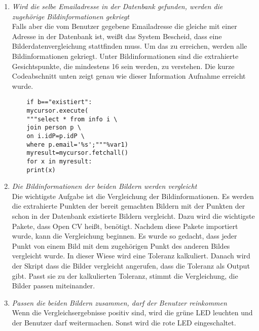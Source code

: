 \begin{enumerate}
	\item \textit{Wird die selbe Emailadresse in der Datenbank gefunden, werden die zugeh{\"o}rige Bildinformationen gekriegt} \\
	Falls aber die vom Benutzer gegebene Emailadresse die gleiche mit einer Adresse in der Datenbank ist, weißt das System Bescheid, dass eine Bilderdatenvergleichung stattfinden muss. Um das zu erreichen, werden alle Bildinformationen gekriegt. Unter Bildinformationen sind die extrahierte Gesichtspunkte, die mindestens 16 sein werden, zu verstehen. Die kurze Codeabschnitt unten zeigt genau wie dieser Information Aufnahme erreicht wurde.
	\begin{lstlisting}
	if b=="existiert":
	mycursor.execute(
	"""select * from info i \
	join person p \
	on i.idP=p.idP \
	where p.email='%s';"""%var1)
	myresult=mycursor.fetchall()
	for x in myresult:
	print(x)
	\end{lstlisting}
	\item \textit{Die Bildinformationen der beiden Bildern werden vergleicht} \\
	Die wichtigste Aufgabe ist die Vergleichung der Bildinformationen. Es werden die extrahierte Punkten der bereit gemachten Bildern mit der Punkten der schon in der Datenbank existierte Bildern vergleicht. Dazu wird die wichtigste Pakete, dass Open CV heißt, ben{\"o}tigt. Nachdem diese Pakete importiert wurde, kann die Vergleichung beginnen. Es wurde so gedacht, dass jeder Punkt von einem Bild mit dem zugeh{\"o}rigen Punkt des anderen Bildes vergleicht wurde. In dieser Wiese wird eine Toleranz kalkuliert. Danach wird der Skript dass die Bilder vergleicht angerufen, dass die Toleranz als Output gibt. Passt sie zu der kalkulierten Toleranz, stimmt die Vergleichung, die Bilder passen miteinander.
	\item \textit{Passen die beiden Bildern zusammen, darf der Benutzer reinkommen} \\
	Wenn die Vergleichsergebnisse positiv sind, wird die gr{\"u}ne LED leuchten und der Benutzer darf weitermachen. Sonst wird die rote LED eingeschaltet.\\
	\end{enumerate}
